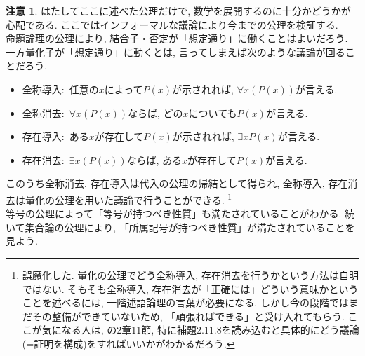\documentclass[a4paper]{bxjsarticle}
\theoremstyle{definition}
\newtheorem{rem}[thm]{注意}
\begin{document}
    \begin{rem}
        はたしてここに述べた公理だけで, 数学を展開するのに十分かどうかが心配である. ここではインフォーマルな議論により今までの公理を検証する.\\
        命題論理の公理により, 結合子・否定が「想定通り」に働くことはよいだろう. 一方量化子が「想定通り」に動くとは, 言ってしまえば次のような議論が回ることだろう. 
        \begin{itemize}
            \item 全称導入$\colon$ 任意の$x$によって$P(x)$が示されれば, $\forall x (P(x))$が言える.
            \item 全称消去$\colon$ $\forall x (P(x))$ならば, どの$x$についても$P(x)$が言える.
            \item 存在導入$\colon$ ある$x$が存在して$P(x)$が示されれば, $\exists x P(x)$が言える.
            \item 存在消去$\colon$ $\exists x (P(x))$ならば, ある$x$が存在して$P(x)$が言える.
        \end{itemize}
        このうち全称消去, 存在導入は代入の公理の帰結として得られ, 全称導入, 存在消去は量化の公理を用いた議論で行うことができる. 
        \footnote{誤魔化した. 量化の公理でどう全称導入, 存在消去を行うかという方法は自明ではない. そもそも全称導入, 存在消去が「正確には」どういう意味かということを述べるには, 一階述語論理の言葉が必要になる. しかし今の段階ではまだその整備ができていないため, 「頑張ればできる」と受け入れてもらう. ここが気になる人は, \cite{kunenfound}の2章11節, 特に補題2.11.8を読み込むと具体的にどう議論(=証明を構成)をすればいいかがわかるだろう. }\\
        等号の公理によって「等号が持つべき性質」も満たされていることがわかる. 続いて集合論の公理により, 「所属記号が持つべき性質」が満たされていることを見よう.
    \end{rem}
\end{document}
